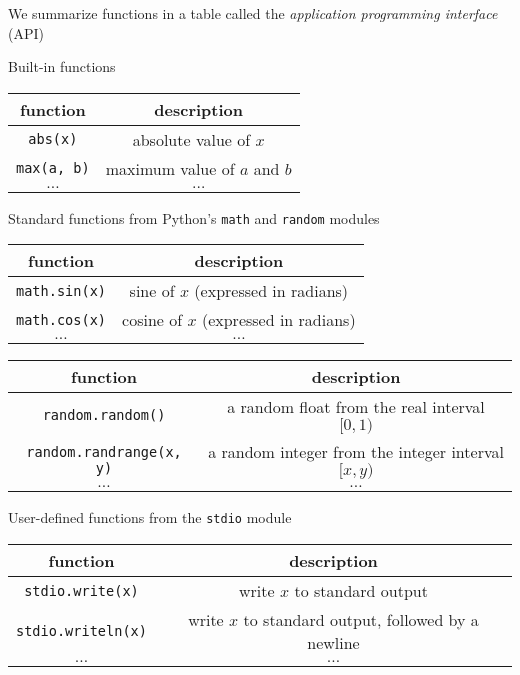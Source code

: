 \documentclass[8pt,a4paper,compress]{beamer}
\begin{document}
\begin{frame}[fragile]
We summarize functions in a table called the \emph{application programming interface} (API)

\smallskip

Built-in functions

\begin{center}
\begin{tabular}{cc}
function & description \\ \hline
\lstinline$abs(x)$ & absolute value of $x$ \\
\lstinline$max(a, b)$ & maximum value of $a$ and $b$ \\
$\dots$ & $\dots$
\end{tabular} 
\end{center}

\smallskip

Standard functions from Python's \lstinline{math} and \lstinline{random} modules

\begin{center}
\begin{tabular}{cc}
function & description \\ \hline
\lstinline$math.sin(x)$ & sine of $x$ (expressed in radians) \\
\lstinline$math.cos(x)$ & cosine of $x$ (expressed in radians) \\
$\dots$ & $\dots$
\end{tabular} 

\begin{tabular}{cc}
function & description \\ \hline
\lstinline$random.random()$ & a random float from the real interval $[0, 1)$ \\
\lstinline$random.randrange(x, y)$ & a random integer from the integer interval $[x, y)$ \\
$\dots$ & $\dots$
\end{tabular} 
\end{center}

\smallskip

User-defined functions from the \lstinline{stdio} module

\begin{center}
\begin{tabular}{cc}
function & description \\ \hline
\lstinline$stdio.write(x)$ & write $x$ to standard output \\
\lstinline$stdio.writeln(x)$ & write $x$ to standard output, followed by a newline \\
$\dots$ & $\dots$
\end{tabular} 
\end{center}
\end{frame}
\end{document}
